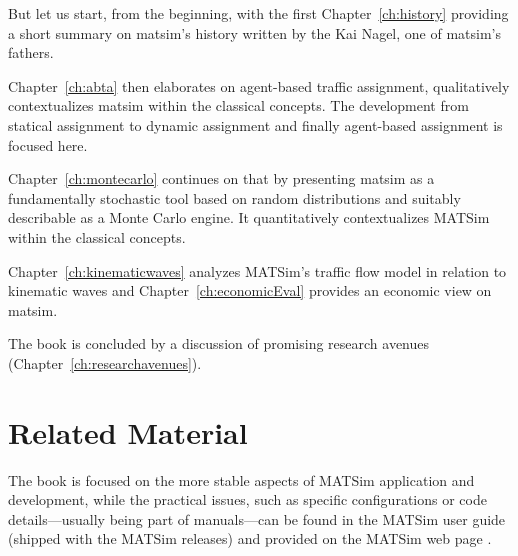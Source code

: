 But let us start, from the beginning, with the first Chapter~\ref{ch:history} providing a short summary on \gls{matsim}'s history written by the Kai Nagel, one of \gls{matsim}'s fathers. 

Chapter~\ref{ch:abta} then elaborates on agent-based traffic assignment, qualitatively contextualizes \gls{matsim} within the classical concepts. The development from statical assignment to dynamic assignment and finally agent-based assignment is focused here.  

Chapter~\ref{ch:montecarlo} continues on that by presenting \gls{matsim} as a fundamentally stochastic tool based on random distributions and suitably describable as a Monte Carlo engine. It quantitatively contextualizes MATSim within the classical concepts.

Chapter~\ref{ch:kinematicwaves} analyzes MATSim's traffic flow model in relation to kinematic waves and Chapter~\ref{ch:economicEval} provides an economic view on \gls{matsim}. 

The book is concluded by a discussion of promising research avenues (Chapter~\ref{ch:researchavenues}).

\section*{Related Material}
The book is focused on the more stable aspects of MATSim application and development, while the practical issues, such as specific configurations or code details---usually being part of manuals---can be found in the MATSim user guide (shipped with the MATSim releases) and provided on the MATSim web page \citep[][]{MATSim_Userguide_2015}.

